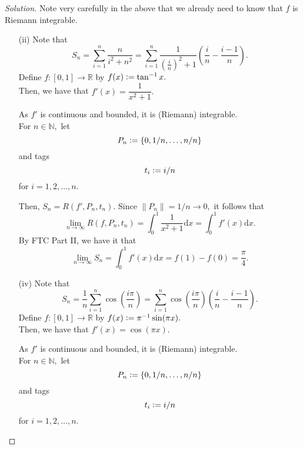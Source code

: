 \documentclass[12pt]{article}
\theoremstyle{definition}
\newenvironment{soln}{\begin{proof}[Solution]}{\end{proof}}
\begin{document}
\begin{itemize}
\begin{soln}
		Note very carefully in the above that we already need to know that $f$ is Riemann integrable.

		\begin{itemize}
			\item[(ii)] Note that 
			\begin{equation*} 
				S_n = \sum_{i=1}^{n}\dfrac{n}{i^2 + n^2} = \sum_{i=1}^{n}\dfrac{1}{\left(\frac{i}{n}\right)^2 + 1}\left(\frac{i}{n} - \frac{i-1}{n}\right).
			\end{equation*}
			Define $f:[0, 1] \to \mathbb{R}$ by $f(x) \vcentcolon= \tan^{-1}x.$\\
			Then, we have that $f'(x) = \dfrac{1}{x^2 + 1}.$

			As $f'$ is continuous and bounded, it is (Riemann) integrable. \\
			For $n \in \mathbb{N},$ let 
			\begin{equation*} 
				P_n \vcentcolon= \{0, 1/n, \ldots, n/n\}
			\end{equation*} and tags 
			\begin{equation*} 
				t_i \vcentcolon= i/n
			\end{equation*} for $i = 1, 2, \ldots, n.$

			Then, $S_n = R(f', P_n, t_n).$ Since $\|P_n\| = 1/n \to 0,$ it follows that
			\begin{equation*} 
				\lim_{n\to \infty}R(f, P_n, t_n) = \int_{0}^{1} \dfrac{1}{x^2 + 1} {\mathrm{d}}x = \int_{0}^{1} f'(x) {\mathrm{d}}x.
			\end{equation*}
			By FTC Part II, we have it that
			\begin{equation*} 
				\lim_{n\to \infty}S_n = \int_{0}^{1} f'(x) {\mathrm{d}}x = f(1) - f(0) = \dfrac{\pi}{4}.
			\end{equation*}
			\item[(iv)] Note that 
			\begin{equation*} 
				S_n = \dfrac{1}{n}\sum_{i=1}^{n}\cos\left(\dfrac{i\pi}{n}\right) = \sum_{i=1}^{n}\cos\left(\dfrac{i\pi}{n}\right)\left(\frac{i}{n} - \frac{i-1}{n}\right).
			\end{equation*}
			Define $f:[0, 1] \to \mathbb{R}$ by $f(x) \vcentcolon= \pi^{-1}\sin(\pi x).$\\
			Then, we have that $f'(x) = \cos(\pi x).$

			As $f'$ is continuous and bounded, it is (Riemann) integrable. \\
			For $n \in \mathbb{N},$ let 
			\begin{equation*} 
				P_n \vcentcolon= \{0, 1/n, \ldots, n/n\}
			\end{equation*} and tags 
			\begin{equation*} 
				t_i \vcentcolon= i/n
			\end{equation*} for $i = 1, 2, \ldots, n.$


\end{itemize}
\end{soln}
\end{itemize}
\end{document}
